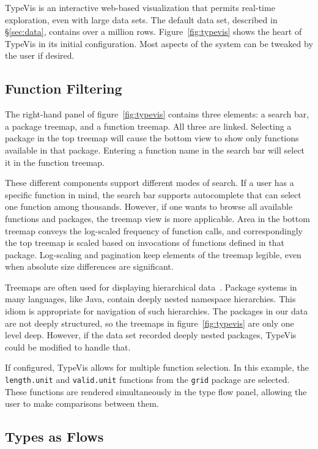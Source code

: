 \documentclass{vgtc}                          %
\newcommand{\typevis}{{\sc TypeVis}\xspace}
\begin{document}
\typevis is an interactive web-based visualization
that permits real-time exploration,
even with large data sets.
The default data set,
described in \S\ref{sec:data},
contains over a million rows.
Figure~\ref{fig:typevis} shows
the heart of \typevis
in its initial configuration.
Most aspects of the system can be tweaked
by the user if desired.

\subsection{Function Filtering}

The right-hand panel of figure~\ref{fig:typevis}
contains three elements: a search bar,
a package treemap,
and a function treemap.
All three are linked.
Selecting a package
in the top treemap will cause the
bottom view to show only functions available in that package.
Entering a function name in the search bar
will select it in the function treemap.

These different components support different modes of search.
If a user has a specific function in mind,
the search bar supports autocomplete
that can select one function among thousands.
However, if one wants to browse
all available functions and packages,
the treemap view is more applicable.
Area in the bottom treemap conveys the log-scaled
frequency of function calls,
and correspondingly the top treemap
is scaled based on invocations
of functions defined in that package.
Log-scaling and pagination keep
elements of the treemap legible,
even when absolute size differences are significant.

Treemaps are often used for displaying hierarchical data~\cite{shneiderman:1992}.
Package systems in many languages,
like Java,
contain deeply nested namespace hierarchies.
This idiom is appropriate for navigation of such
hierarchies.
The packages in our data are not deeply structured,
so the treemaps in figure~\ref{fig:typevis} are only one level deep.
However, if the data set recorded deeply nested packages,
\typevis could be modified to handle that.

If configured, \typevis allows for multiple function selection.
In this example, the {\tt length.unit} and {\tt valid.unit} functions
from the {\tt grid} package are selected.
These functions are rendered simultaneously in the type flow
panel, allowing the user to make comparisons between them.

\subsection{Types as Flows}
\end{document}

